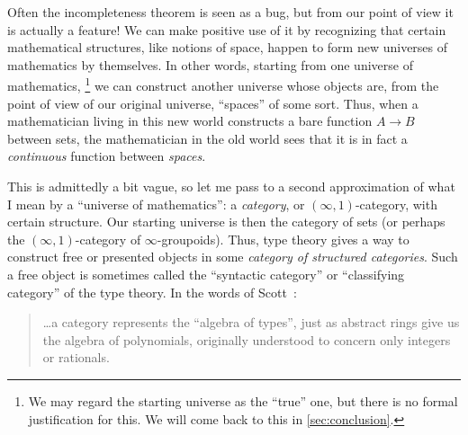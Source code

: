 \documentclass[12pt]{article}
\def\oo{\ensuremath{\infty}}
\def\io{\ensuremath{(\oo,1)}}
\numberwithin{equation}{section}
\begin{document}
Often the incompleteness theorem
is seen as a bug, but from our point of view
it is actually a feature!
We can make positive use of it by recognizing that certain mathematical structures, like notions of space, %
happen to form new universes of mathematics by themselves.
%
In other words, starting from one universe of mathematics,%
\footnote{We may regard the starting universe as the ``true'' one, but there is no formal justification for this.
  We will come back to this in \cref{sec:conclusion}.}
we can construct another universe whose objects are, from the point of view of our original universe, ``spaces'' of some sort.
Thus, when a mathematician living in this new world constructs a bare function $A\to B$ between sets, the mathematician in the old world sees that it is in fact a \emph{continuous} function between \emph{spaces}.

This is admittedly a bit vague, so
let me pass to a second approximation of what I mean by a ``universe of mathematics'': a \emph{category}, or \io-category, with certain structure.
Our starting universe is then the category of sets (or perhaps the \io-category of \oo-groupoids).
Thus, type theory gives a way to construct free or presented objects in some \emph{category of structured categories}.
Such a free object is sometimes called the ``syntactic category'' or ``classifying category'' of the type theory. %
In the words of Scott~\cite{scott:ttalt}:
\begin{quote}
  \dots a category represents the ``algebra of types'', just as abstract rings give us the algebra of polynomials, originally understood to concern only integers or rationals.
\end{quote}
\end{document}
